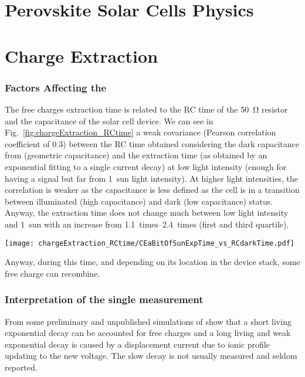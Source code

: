 \section{Perovskite Solar Cells Physics}

\section{Charge Extraction}
	\subsubsection{Factors Affecting the }
		The free charges extraction time is related to the RC time of the \SI{50}{\ohm} resistor and the capacitance of the solar cell device. We can see in Fig.~\ref{fig:chargeExtraction_RCtime} a weak covariance (Pearson correlation coefficient of 0.3) between the RC time obtained considering the dark capacitance from  (geometric capacitance) and the extraction time (as obtained by an exponential fitting to a single  current decay) at low light intensity (enough for having a signal but far from 1~sun light intensity). At higher light intensities, the correlation is weaker as the capacitance is less defined as the cell is in a transition between illuminated (high capacitance) and dark (low capacitance) status. Anyway, the extraction time does not change much between low light intensity and 1~sun with an increase from \SIrange{1.1}{2.4}{times} (first and third quartile).

		\begin{SCfigure}%
			\centering
			\texttt{[image: chargeExtraction\_RCtime/CEaBitOfSunExpTime\_vs\_RCdarkTime.pdf]}
			\label{fig:chargeExtraction_RCtime}
		\end{SCfigure}

		Anyway, during this time, and depending on its location in the device stack, some free charge can recombine.

	\subsubsection{Interpretation of the single measurement}
		From some preliminary and unpublished simulations of  show that a short living exponential decay can be accounted for free charges and a long living and weak exponential decay is caused by a displacement current due to ionic profile updating to the new voltage. The slow decay is not usually measured and seldom reported\cite{ORegan2015b}.

